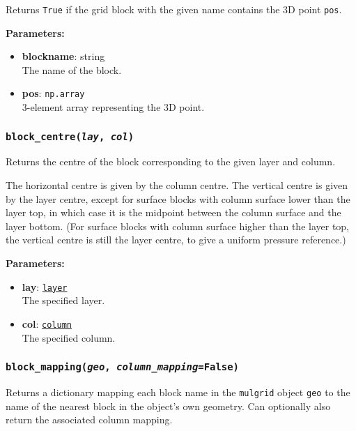 Returns \texttt{True} if the grid block with the given name contains the 3D point \texttt{pos}.

\textbf{Parameters:}
\begin{itemize}
\item \textbf{blockname}: string\\
  The name of the block.
\item \textbf{pos}: \texttt{np.array}\\
  3-element array representing the 3D point.
\end{itemize}

\begin{snugshade}\subsubsection{\texttt{block\_centre(\emph{lay}, \emph{col})}}\end{snugshade}
\label{sec:mulgrid:block_centre}

Returns the centre of the block corresponding to the given layer and column.

The horizontal centre is given by the column centre. The vertical centre is given by the layer centre, except for surface blocks with column surface lower than the layer top, in which case it is the midpoint between the column surface and the layer bottom.  (For surface blocks with column surface higher than the layer top, the vertical centre is still the layer centre, to give a uniform pressure reference.)

\textbf{Parameters:}
\begin{itemize}
\item \textbf{lay}: \hyperref[layerobjects]{\texttt{layer}}\\
  The specified layer.
\item \textbf{col}: \hyperref[columnobjects]{\texttt{column}}\\
  The specified column.
\end{itemize}

\begin{snugshade}\subsubsection{\texttt{block\_mapping(\emph{geo}, \emph{column\_mapping}=\texttt{False})}}\end{snugshade}
\label{sec:mulgrid:block_mapping}

Returns a dictionary mapping each block name in the \texttt{mulgrid} object \texttt{geo} to the name of the nearest block in the object's own geometry.  Can optionally also return the associated column mapping.

